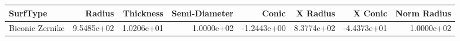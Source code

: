 \begin{tabular}{lrrrrrrr}
\toprule
       SurfType &     Radius &  Thickness &  Semi-Diameter &       Conic &   X Radius &     X Conic &  Norm Radius \\
\midrule
Biconic Zernike & 9.5485e+02 & 1.0206e+01 &     1.0000e+02 & -1.2443e+00 & 8.3774e+02 & -4.4373e+01 &   1.0000e+02 \\
\bottomrule
\end{tabular}

